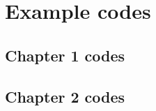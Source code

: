 \documentclass{tufte-book} %
\begin{document}
%

\chapter{Example codes}
\label{ch:11}


\newpage


\section{Chapter 1 codes}


\newpage


\section{Chapter 2 codes}





\backmatter




\printindex %
\end{document}
